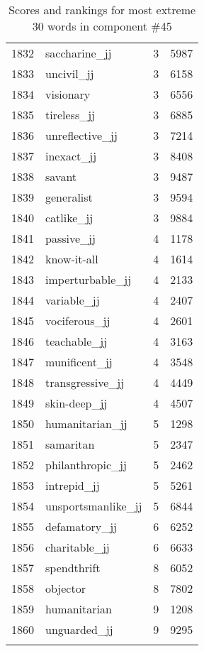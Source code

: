\begin{longtable}[!htbp]{| rlr@{.}l |}
    1832 & saccharine\_jj & 3 & 5987 \\
    1833 & uncivil\_jj & 3 & 6158 \\
    1834 & visionary & 3 & 6556 \\
    1835 & tireless\_jj & 3 & 6885 \\
    1836 & unreflective\_jj & 3 & 7214 \\
    1837 & inexact\_jj & 3 & 8408 \\
    1838 & savant & 3 & 9487 \\
    1839 & generalist & 3 & 9594 \\
    1840 & catlike\_jj & 3 & 9884 \\
    1841 & passive\_jj & 4 & 1178 \\
    1842 & know-it-all & 4 & 1614 \\
    1843 & imperturbable\_jj & 4 & 2133 \\
    1844 & variable\_jj & 4 & 2407 \\
    1845 & vociferous\_jj & 4 & 2601 \\
    1846 & teachable\_jj & 4 & 3163 \\
    1847 & munificent\_jj & 4 & 3548 \\
    1848 & transgressive\_jj & 4 & 4449 \\
    1849 & skin-deep\_jj & 4 & 4507 \\
    1850 & humanitarian\_jj & 5 & 1298 \\
    1851 & samaritan & 5 & 2347 \\
    1852 & philanthropic\_jj & 5 & 2462 \\
    1853 & intrepid\_jj & 5 & 5261 \\
    1854 & unsportsmanlike\_jj & 5 & 6844 \\
    1855 & defamatory\_jj & 6 & 6252 \\
    1856 & charitable\_jj & 6 & 6633 \\
    1857 & spendthrift & 8 & 6052 \\
    1858 & objector & 8 & 7802 \\
    1859 & humanitarian & 9 & 1208 \\
    1860 & unguarded\_jj & 9 & 9295 \\
    \hline
    \caption{Scores and rankings for most extreme 30 words in component \#45} \\
\end{longtable}
